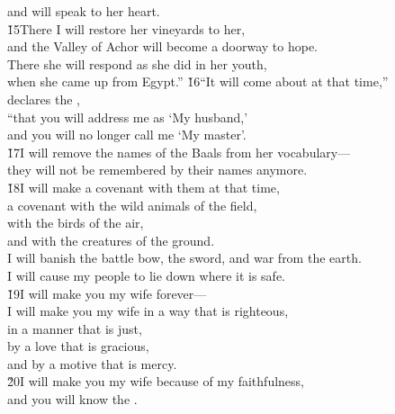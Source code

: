 \begin{poetry}
\poemlll       and will speak to her heart. \\
\poeml \v{15}There I will restore her vineyards to her, \\
\poemll    and the Valley of Achor will become a doorway to hope. \\
\poeml There she will respond as she did in her youth, \\
\poemll    when she came up from Egypt.''
\poeml \v{16}``It will come about at that time,'' \\
\poemll    declares the , \\
\poeml ``that you will address me as `My husband,' \\
\poemll    and you will no longer call me `My master'. \\
\poeml \v{17}I will remove the names of the Baals from her vocabulary--- \\
\poemll    they will not be remembered by their names anymore. \\
\poeml \v{18}I will make a covenant with them at that time, \\
\poemll    a covenant with the wild animals of the field, \\
\poeml with the birds of the air, \\
\poemll    and with the creatures of the ground. \\
\poeml I will banish the battle bow, the sword, and war from the earth. \\
\poemll    I will cause my people to lie down where it is safe. \\
\poeml \v{19}I will make you my wife forever--- \\
\poeml I will make you my wife in a way that is righteous, \\
\poemll    in a manner that is just, \\
\poeml by a love that is gracious, \\
\poemll    and by a motive that is mercy. \\
\poeml \v{20}I will make you my wife because of my faithfulness, \\
\poemll    and you will know the . \\

\end{poetry}
